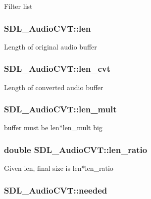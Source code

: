 Filter list \hypertarget{struct_s_d_l___audio_c_v_t_aeaeb8c5a63c3ab96471fbfdf412c78ff}{
\subsubsection[{len}]{ S\-D\-L\-\_\-\-Audio\-C\-V\-T\-::len}}\label{struct_s_d_l___audio_c_v_t_aeaeb8c5a63c3ab96471fbfdf412c78ff}
Length of original audio buffer \hypertarget{struct_s_d_l___audio_c_v_t_a5c60163f34d1947e5b166c23aba9879d}{
\subsubsection[{len\-\_\-cvt}]{ S\-D\-L\-\_\-\-Audio\-C\-V\-T\-::len\-\_\-cvt}}\label{struct_s_d_l___audio_c_v_t_a5c60163f34d1947e5b166c23aba9879d}
Length of converted audio buffer \hypertarget{struct_s_d_l___audio_c_v_t_ac9662d47cf2348b82b27b151150116b0}{
\subsubsection[{len\-\_\-mult}]{ S\-D\-L\-\_\-\-Audio\-C\-V\-T\-::len\-\_\-mult}}\label{struct_s_d_l___audio_c_v_t_ac9662d47cf2348b82b27b151150116b0}
buffer must be len$\ast$len\-\_\-mult big \hypertarget{struct_s_d_l___audio_c_v_t_a5628ff5ccf711de9d77c0a4a9f57d2f0}{
\subsubsection[{len\-\_\-ratio}]{\setlength{\rightskip}{0pt plus 5cm}double S\-D\-L\-\_\-\-Audio\-C\-V\-T\-::len\-\_\-ratio}}\label{struct_s_d_l___audio_c_v_t_a5628ff5ccf711de9d77c0a4a9f57d2f0}
Given len, final size is len$\ast$len\-\_\-ratio \hypertarget{struct_s_d_l___audio_c_v_t_ac600a035a48df05e14d3712fd6953ad4}{
\subsubsection[{needed}]{ S\-D\-L\-\_\-\-Audio\-C\-V\-T\-::needed}}\label{struct_s_d_l___audio_c_v_t_ac600a035a48df05e14d3712fd6953ad4}
